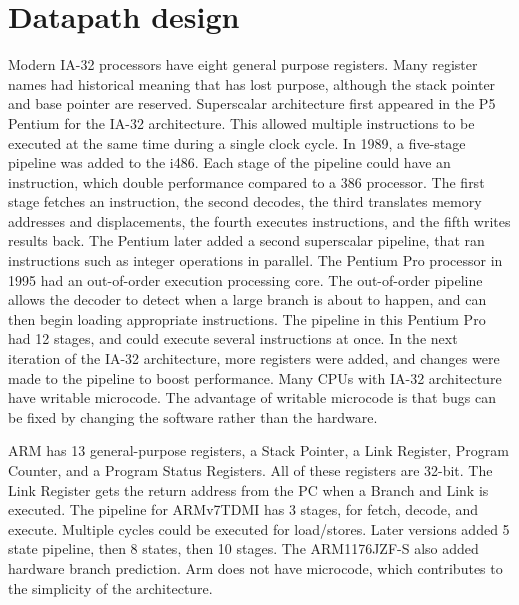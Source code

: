 \documentclass[letterpaper,10pt,titlepage,twocolumn]{article}
\begin{document}
\section*{Datapath design}

Modern IA-32 processors have eight general purpose registers.
Many register names had historical meaning that has lost purpose, although the stack pointer and base pointer are reserved.
Superscalar architecture first appeared in the P5 Pentium for the IA-32 architecture.
This allowed multiple instructions to be executed at the same time during a single clock cycle.
In 1989, a five-stage pipeline was added to the i486.
Each stage of the pipeline could have an instruction, which double performance compared to a 386 processor.
The first stage fetches an instruction, the second decodes, the third translates memory addresses and displacements, the fourth executes instructions, and the fifth writes results back.
The Pentium later added a second superscalar pipeline, that ran instructions such as integer operations in parallel.
The Pentium Pro processor in 1995 had an out-of-order execution processing core.
The out-of-order pipeline allows the decoder to detect when a large branch is about to happen, and can then begin loading appropriate instructions.
The pipeline in this Pentium Pro had 12 stages, and could execute several instructions at once.
In the next iteration of the IA-32 architecture, more registers were added, and changes were made to the pipeline to boost performance.
Many CPUs with IA-32 architecture have writable microcode.
The advantage of writable microcode is that bugs can be fixed by changing the software rather than the hardware.
\newline
\par

ARM has 13 general-purpose registers, a Stack Pointer, a Link Register, Program Counter, and a Program Status Registers.
All of these registers are 32-bit.
The Link Register gets the return address from the PC when a Branch and Link is executed.
The pipeline for ARMv7TDMI has 3 stages, for fetch, decode, and execute.
Multiple cycles could be executed for load/stores.
Later versions added 5 state pipeline, then 8 states, then 10 stages.
The ARM1176JZF-S also added hardware branch prediction.
Arm does not have microcode, which contributes to the simplicity of the architecture.
\newline
\par
\end{document}
